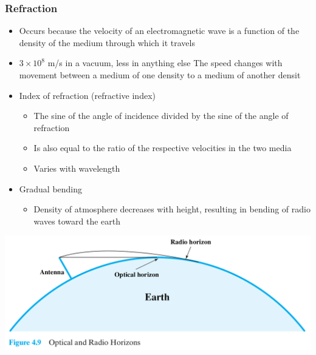 \documentclass[pdflatex,compress]{beamer}
\begin{document}
\begin{frame}
	\frametitle{Refraction}
	\begin{itemize}
		\item Occurs because the velocity of an electromagnetic wave is a function of the density of the medium through which it travels
		\item $ 3 \times 10^8 $ m/s in a vacuum, less in anything else The speed changes with movement between a medium of one density to a medium of another densit
		\item Index of refraction (refractive index)
		\begin{itemize}
			\item The sine of the angle of incidence divided by the sine of the angle of refraction
			\item Is also equal to the ratio of the respective velocities in the two media
			\item Varies with wavelength
		\end{itemize}
		\item Gradual bending
		\begin{itemize}
			\item Density of atmosphere decreases with height, resulting in bending of radio waves toward the earth
		\end{itemize}
	\end{itemize}
\end{frame}

\begin{frame}
	\begin{center}
		\includegraphics[width=\linewidth]{img/img26}
	\end{center}
\end{frame}
\end{document}
